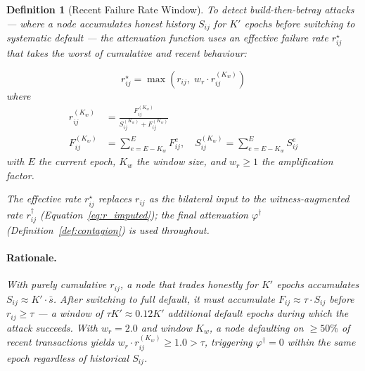 \documentclass[11pt]{article}
\newtheorem{definition}[theorem]{Definition}
\begin{document}
\begin{definition}[Recent Failure Rate Window]\label{def:recent_window}
To detect \emph{build-then-betray} attacks --- where a node accumulates honest history $S_{ij}$ for $K'$ epochs before switching to systematic default --- the attenuation function uses an \emph{effective failure rate} $r^{\star}_{ij}$ that takes the worst of cumulative and recent behaviour:

\begin{equation}\label{eq:recent_rate}
    r^{\star}_{ij} = \max\!\left(r_{ij},\; w_r \cdot r^{(K_w)}_{ij}\right)
\end{equation}
where
\begin{align}
    r^{(K_w)}_{ij} &= \frac{F^{(K_w)}_{ij}}{S^{(K_w)}_{ij} + F^{(K_w)}_{ij}} \\
    F^{(K_w)}_{ij} &= \textstyle\sum_{e=E-K_w}^{E} F^e_{ij}, \quad S^{(K_w)}_{ij} = \textstyle\sum_{e=E-K_w}^{E} S^e_{ij}
\end{align}
with $E$ the current epoch, $K_w$ the \emph{window size}, and $w_r \geq 1$ the \emph{amplification factor}.

The effective rate $r^{\star}_{ij}$ replaces $r_{ij}$ as the bilateral input to the witness-augmented rate $r^{\dagger}_{ij}$ (Equation~\ref{eq:r_imputed}); the final attenuation $\varphi^{\dagger}$ (Definition~\ref{def:contagion}) is used throughout.

\paragraph{Rationale.} With purely cumulative $r_{ij}$, a node that trades honestly for $K'$ epochs accumulates $S_{ij} \approx K' \cdot \bar{s}$. After switching to full default, it must accumulate $F_{ij} \approx \tau \cdot S_{ij}$ before $r_{ij} \geq \tau$ --- a window of $\tau K' \approx 0.12 K'$ additional default epochs during which the attack succeeds. With $w_r = 2.0$ and window $K_w$, a node defaulting on $\geq 50\%$ of recent transactions yields $w_r \cdot r^{(K_w)}_{ij} \geq 1.0 > \tau$, triggering $\varphi^{\dagger} = 0$ within the same epoch regardless of historical $S_{ij}$.
\end{definition}
\end{document}
